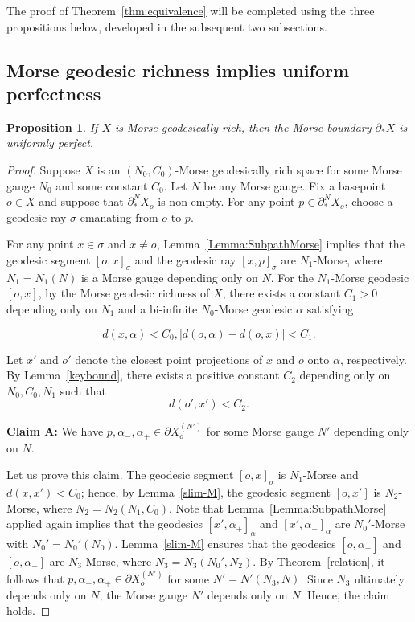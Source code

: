 \documentclass[a4paper,11pt,oneside]{article}
\newtheorem{Proposition}[Theorem]{Proposition}
\begin{document}
 The proof of Theorem~\ref{thm:equivalence} will be completed using the three propositions below, developed in the subsequent two subsections.

\subsection{Morse geodesic richness implies uniform perfectness }

\begin{Proposition}\label{MGR-UP}
If $X$ is Morse geodesically rich, then the Morse boundary $\partial_*X$ is uniformly perfect.    
\end{Proposition}

\begin{proof}
Suppose $X$ is an $(N_0, C_0)$-Morse geodesically rich space for some Morse gauge $N_0$ and some constant $C_0$.
   Let $N$ be any Morse gauge. Fix a basepoint $o\in X$ and suppose that $\partial_*^NX_o$ is non-empty. For any point $p\in\partial_*^NX_o$, choose a geodesic ray $\sigma$ emanating from $o$ to $p$.
    
   For any point $x\in \sigma$ and $x\neq o$, Lemma~\ref{Lemma:SubpathMorse} implies that the geodesic segment $[o,x]_{\sigma}$ and the geodesic ray $[x, p]_{\sigma}$ are $N_1$-Morse, where $N_1= N_1(N)$ is a Morse gauge depending only on $N$.
For the $N_1$-Morse geodesic $[o, x]$, by the Morse geodesic richness of $X$,
there exists a constant $C_1>0$ depending only on $N_1$ and a bi-infinite $N_0$-Morse geodesic $\alpha$ satisfying 

\begin{equation}\label{C0C1}
     d(x,\alpha)<C_0, \left|d(o, \alpha)-d(o,x)\right|<C_1.
\end{equation}

  
   Let $x'$ and $o'$ denote the closest point projections of $x$ and $o$ onto $\alpha$, respectively. 
  By Lemma~\ref{keybound}, there exists a positive constant $C_2$ depending only on $N_0, C_0, N_1$ such that 
  \begin{equation}\label{C2}
    d(o', x')<C_2.
  \end{equation}
  

\textbf{Claim A:}
We have $p,\alpha_-,\alpha_+\in \partial X_o^{(N')}$ for some Morse gauge $N'$ depending only on $N$. 

Let us prove this claim. 
The geodesic segment $[o,x]_{\sigma}$ is $N_1$-Morse and $d(x,x')<C_0$; 
hence, by Lemma~\ref{slim-M}, the geodesic segment $[o, x']$ is $N_2$-Morse, where $N_2=N_2(N_1, C_0)$. 
Note that Lemma~\ref{Lemma:SubpathMorse} applied again implies that the geodesics $[x',\alpha_+]_\alpha$ and $[x',\alpha_-]_\alpha$ are $N_0'$-Morse with $N_0' = N_0'(N_0)$. 
Lemma~\ref{slim-M} ensures that the geodesics $[o,\alpha_+]$ and $[o,\alpha_-]$ are $N_3$-Morse, where $N_3=N_3(N_0', N_2)$. 
By Theorem~\ref{relation}, it follows that $p, \alpha_-,\alpha_+\in \partial X_o^{(N')}$ for some $N'=N'(N_3, N)$. Since $N_3$ ultimately depends only on $N$, the Morse gauge $N'$ depends only on $N$. Hence, the claim holds.


\end{proof}
\end{document}
